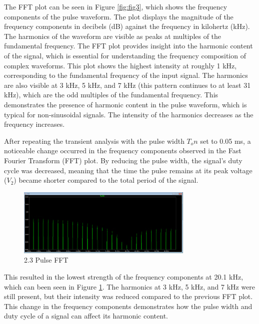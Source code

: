 \documentclass{article}
\begin{document}
The FFT plot can be seen in Figure \ref{fig:fig3}, which shows the frequency components of the pulse waveform. The plot
displays the magnitude of the frequency components in decibels (dB) against the
frequency in kilohertz (kHz). The harmonics of the waveform are visible as peaks
at multiples of the fundamental frequency. The FFT plot provides insight into
the harmonic content of the signal, which is essential for understanding the
frequency composition of complex waveforms. This plot shows the highest intensity at roughly 1 kHz, 
corresponding to the fundamental frequency of the input signal. 
The harmonics are also visible at 3 kHz, 5 kHz, and 7 kHz (this pattern continues to at least 31 kHz), which are the odd 
multiples of the fundamental frequency. This demonstrates the presence of harmonic content in 
the pulse waveform, which is typical for non-sinusoidal signals. The intensity of the harmonics decreases as the frequency increases.
\newline

After repeating the transient analysis with the pulse width $T_on$
set to 0.05 ms, a noticeable change occurred in the frequency components
observed in the Fast Fourier Transform (FFT) plot. By reducing the pulse width,
the signal's duty cycle was decreased, meaning that the time the pulse remains
at its peak voltage ($V_2$) became shorter compared to the total period of the signal.

\begin{figure}[H]
	\centering
	\includegraphics[width=0.75\textwidth]{Copy of Lab 4 - 2.3.PNG}
	\caption{2.3 Pulse FFT}
	\label{fig:fig4}
\end{figure}


This resulted in the lowest strength of the frequency components at 20.1 kHz, which
can been seen in Figure \ref{fig:fig4}. The harmonics at 3 kHz, 5 kHz, and 7 kHz were still present, but their 
intensity was reduced compared to the previous FFT plot. This change in the frequency components
demonstrates how the pulse width and duty cycle of a signal can affect its
harmonic content. 
\newline
\end{document}
